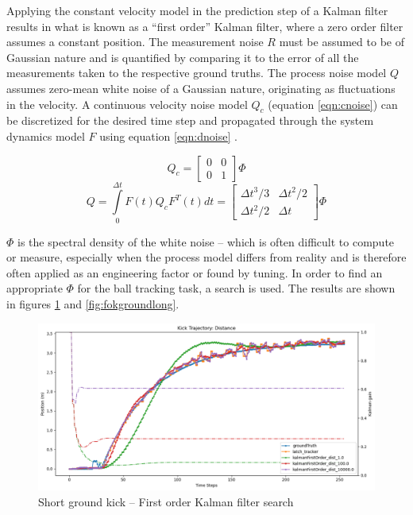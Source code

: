 \documentclass[a4paper,twoside,12pt]{report}
\begin{document}
Applying the constant velocity model in the prediction step of a Kalman filter results in what is known as a ``first order'' Kalman filter, where a zero order filter assumes a constant position. The measurement noise $R$ must be assumed to be of Gaussian nature and is quantified by comparing it to the error of all the measurements taken to the respective ground truths. The process noise model $Q$ assumes zero-mean white noise of a Gaussian nature, originating as fluctuations in the velocity. A continuous velocity noise model $Q_c$ (equation \ref{eqn:cnoise}) can be discretized for the desired time step and propagated through the system dynamics model $F$ using equation \ref{eqn:dnoise} \citep{kalmanpy}.

\begin{equation} 
Q_c
=
\begin{bmatrix}
    0 & 0 \\
    0 & 1 
\end{bmatrix}
\Phi
\label{eqn:cnoise}
\end{equation}
\begin{equation} 
Q = \int\limits_0^{\Delta t} F(t)Q_cF^T(t)dt
=
\begin{bmatrix}
    \Delta t^3/3 & \Delta t^2/2 \\
    \Delta t^2/2 & \Delta t 
\end{bmatrix}
\Phi
\label{eqn:dnoise}
\end{equation}

$\Phi$ is the spectral density of the white noise -- which is often difficult to compute or measure, especially when the process model differs from reality and is therefore often applied as an engineering factor or found by tuning. In order to find an appropriate $\Phi$ for the ball tracking task, a search is used. The results are shown in figures \ref{fig:fokgroundshort} and \ref{fig:fokgroundlong}.

\begin{figure}[h!]
\begin{center}
\includegraphics[width=12cm]{images/fok_ground_short.png}
\caption{Short ground kick -- First order Kalman filter search}
\label{fig:fokgroundshort}
\end{center}
\end{figure}
\end{document}
